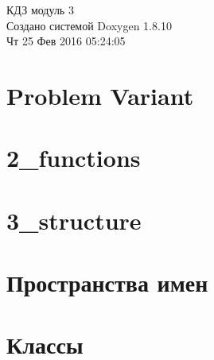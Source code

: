 \documentclass[twoside]{article}
\newcommand{\+}{\discretionary{\mbox{\scriptsize$\hookleftarrow$}}{}{}}
\newcommand{\clearemptydoublepage}{%
  \newpage{\pagestyle{empty}\cleardoublepage}%
}
\begin{document}
\begin{titlepage}
\vspace*{7cm}
\begin{center}%
{\Large КДЗ модуль 3 }\\
\vspace*{1cm}
{\large Создано системой Doxygen 1.8.10}\\
\vspace*{0.5cm}
{\small Чт 25 Фев 2016 05:24:05}\\
\end{center}
\end{titlepage}
\tableofcontents
{}

\section{Problem Variant}
\label{md_1_problem_variant}

\section{2\+\_\+functions}
\label{md_2_functions}

\section{3\+\_\+structure}
\label{md_3_structure}

\section{Пространства имен}


\section{Классы}















\newpage
{}
\clearemptydoublepage
{}
\printindex
\end{document}
